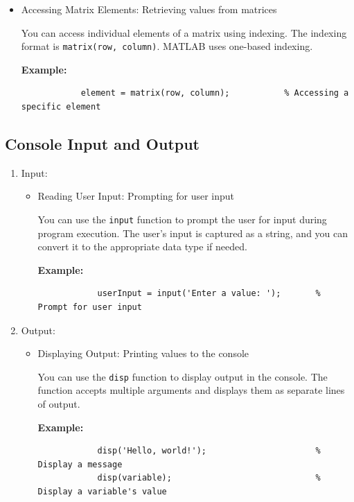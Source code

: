 \documentclass[
11pt, %
a4paper, %
oneside, %
headinclude,footinclude, %
BCOR5mm, %
]{scrartcl}
\begin{document}
\begin{enumerate}
\begin{itemize}
		\item Accessing Matrix Elements: Retrieving values from matrices
		
		You can access individual elements of a matrix using indexing. The indexing format is \texttt{matrix(row, column)}. MATLAB uses one-based indexing.
		
		\textbf{Example:}
		\begin{verbatim}
			element = matrix(row, column);           % Accessing a specific element
		\end{verbatim}
	\end{itemize}
\end{enumerate}
\subsection{Console Input and Output}
\begin{enumerate}
	\item Input:
	\begin{itemize}
		\item Reading User Input: Prompting for user input
		
		You can use the \texttt{input} function to prompt the user for input during program execution. The user's input is captured as a string, and you can convert it to the appropriate data type if needed.
		
		\textbf{Example:}
		\begin{verbatim}
			userInput = input('Enter a value: ');       % Prompt for user input
		\end{verbatim}
	\end{itemize}
	
	\item Output:
	\begin{itemize}
		\item Displaying Output: Printing values to the console
		
		You can use the \texttt{disp} function to display output in the console. The function accepts multiple arguments and displays them as separate lines of output.
		
		\textbf{Example:}
		\begin{verbatim}
			disp('Hello, world!');                      % Display a message
			disp(variable);                             % Display a variable's value
		\end{verbatim}
	\end{itemize}
\end{enumerate}
\end{document}
